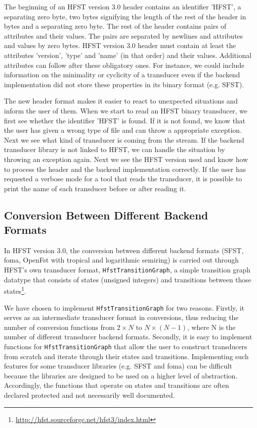 \documentclass{llncs}
\begin{document}
The beginning of an HFST version 3.0 header contains an identifier
'HFST', a separating zero byte, two bytes signifying the length of
the rest of the header in bytes and a separating zero byte. The rest
of the header contains pairs of attributes and their values. The pairs
are separated by newlines and attributes and values by zero bytes. 
HFST version 3.0 header must contain at least the attributes
'version', 'type' and 'name' (in that order) and their values. 
Additional attributes can follow after these obligatory ones. 
For instance, we could include information on the minimality or
cyclicity of a transducer even if the backend implementation did not
store these properties in its binary format (e.g. SFST). 

The new header format makes it easier to react to unexpected
situations and inform the user of them. When we start to read an HFST
binary transducer, we first see whether the identifier 'HFST' is
found. If it is not found, we know that the user has given a wrong
type of file and can throw a appropriate exception. 
Next we see what kind of transducer is coming from the stream. 
If the backend transducer library is not linked to HFST, we can handle
the situation by throwing an exception again. 
Next we see the HFST version used and know how to process the header
and the backend implementation correctly. 
If the user has requested a verbose mode for a tool that reads the
transducer, it is possible to print the name of each transducer 
before or after reading it.

\subsection{Conversion Between Different Backend Formats}

In HFST version 3.0, the conversion between different backend formats 
(SFST, foma, OpenFst with tropical and logarithmic semiring) is
carried out through HFST's own transducer format, \texttt{HfstTransitionGraph}, 
a simple transition graph datatype that consists of states (unsigned
integers) and transitions between those 
states\footnote{\url{http://hfst.sourceforge.net/hfst3/index.html}}.
 
We have chosen to implement \texttt{HfstTransitionGraph} for two
reasons. Firstly, it serves as an intermediate transducer format in
conversions, thus reducing the number of conversion functions from
$2 \times N$ to $N \times (N - 1)$, where N is the number of different
transducer backend formats. Secondly, it is easy to implement functions for 
\texttt{HfstTransitionGraph} that allow the user to construct transducers from 
scratch and iterate through their states and transitions. Implementing
such features for some transducer libraries (e.g. SFST and foma) can
be difficult because the libraries are designed to be used on a higher level of 
abstraction. Accordingly, the functions that operate on states and 
transitions are often declared protected and not necessarily well
documented.
\end{document}
